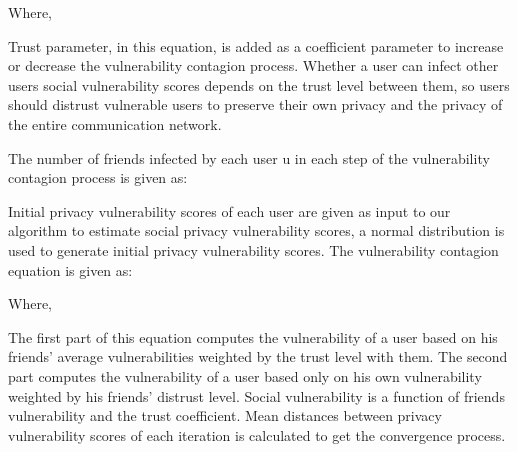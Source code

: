 Where,


Trust parameter,
	in this equation,
	is added as a coefficient parameter to increase or decrease the vulnerability contagion process.
Whether a user can infect other users social vulnerability scores depends on the trust level between them,
	so users should distrust vulnerable users to preserve their own privacy and the privacy of the entire communication network.

The number of friends infected by each user u in each step of the vulnerability contagion process is given as:


Initial privacy vulnerability scores of each user are given as input to our algorithm to estimate social privacy vulnerability scores,
	a normal distribution is used to generate initial privacy vulnerability scores.
The vulnerability contagion equation is given as:


Where,

The first part of this equation computes the vulnerability of a user based on his friends' average vulnerabilities weighted by the trust level with them.
The second part computes the vulnerability of a user based only on his own vulnerability weighted by his friends' distrust level.
Social vulnerability is a function of friends vulnerability and the trust coefficient.
Mean distances between privacy vulnerability scores of each iteration is calculated to get the convergence process.%





